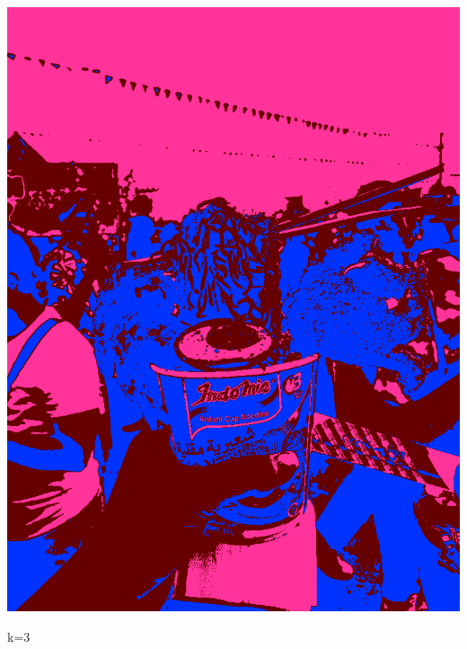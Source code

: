 \documentclass{article}
\begin{document}
\begin{newpage}
\begin{center}
\begin{minipage}{0.8\textwidth}
\begin{minipage}{0.3\linewidth}
            \centerline{\includegraphics[width=\textwidth]{src/ramen_c3_output.png}}
            \centerline{k=3}
        \end{minipage}
        \begin{minipage}{0.3\linewidth}
            \vspace{\gap}

\end{minipage}
\end{minipage}
\end{center}
\end{newpage}
\end{document}
